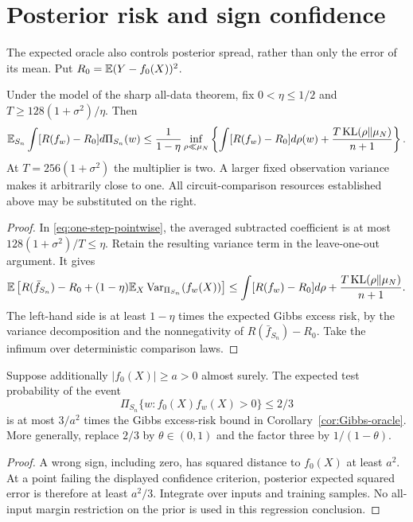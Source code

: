 \section{Posterior risk and sign confidence}
\label{sec:posterior-confidence}
The expected oracle also controls posterior spread, rather than only the error of its mean. Put $R_0=\mathbb E(Y-f_0(X))^2$.

\begin{corollary}
\label{cor:Gibbs-oracle}
Under the model of the sharp all-data theorem, fix $0<\eta\le1/2$ and $T\ge128(1+\sigma^2)/\eta$. Then
\[
 \mathbb E_{S_n}\int[R(f_w)-R_0]d\Pi_{S_n}(w)
 \le\frac1{1-\eta}\inf_{\rho\ll\mu_N}
 \left\{\int[R(f_w)-R_0]d\rho(w)
            +\frac{T\operatorname{KL}(\rho\|\mu_N)}{n+1}\right\}.
\]
At $T=256(1+\sigma^2)$ the multiplier is two. A larger fixed observation variance makes it arbitrarily close to one. All circuit-comparison resources established above may be substituted on the right.
\end{corollary}
\begin{proof}
In \eqref{eq:one-step-pointwise}, the averaged subtracted coefficient is at most $128(1+\sigma^2)/T\le\eta$. Retain the resulting variance term in the leave-one-out argument. It gives
\[
 \mathbb E\left[R(\bar f_{S_n})-R_0
       +(1-\eta)\mathbb E_X\operatorname{Var}_{\Pi_{S_n}}(f_w(X))\right]
 \le\int[R(f_w)-R_0]d\rho+\frac{T\operatorname{KL}(\rho\|\mu_N)}{n+1}.
\]
The left-hand side is at least $1-\eta$ times the expected Gibbs excess risk, by the variance decomposition and the nonnegativity of $R(\bar f_{S_n})-R_0$. Take the infimum over deterministic comparison laws.
\end{proof}

\begin{corollary}
Suppose additionally $|f_0(X)|\ge a>0$ almost surely. The expected test probability of the event
\[
 \Pi_{S_n}\{w:f_0(X)f_w(X)>0\}\le2/3
\]
is at most $3/a^2$ times the Gibbs excess-risk bound in Corollary~\ref{cor:Gibbs-oracle}. More generally, replace $2/3$ by $\theta\in(0,1)$ and the factor three by $1/(1-\theta)$.
\end{corollary}
\begin{proof}
A wrong sign, including zero, has squared distance to $f_0(X)$ at least $a^2$. At a point failing the displayed confidence criterion, posterior expected squared error is therefore at least $a^2/3$. Integrate over inputs and training samples. No all-input margin restriction on the prior is used in this regression conclusion.
\end{proof}
